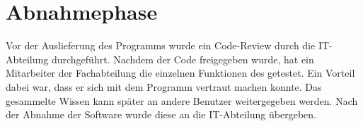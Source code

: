 \section{Abnahmephase} 
\label{sec:Abnahmephase}
Vor der Auslieferung des Programms wurde ein Code-Review durch die IT-Abteilung durchgeführt.
Nachdem der Code freigegeben wurde, hat ein Mitarbeiter der Fachabteilung die einzelnen
Funktionen des  getestet. Ein Vorteil dabei war, dass er sich mit dem
Programm vertraut machen konnte. Das gesammelte Wissen kann später an andere Benutzer weitergegeben werden.
Nach der Abnahme der Software wurde diese an die IT-Abteilung übergeben.